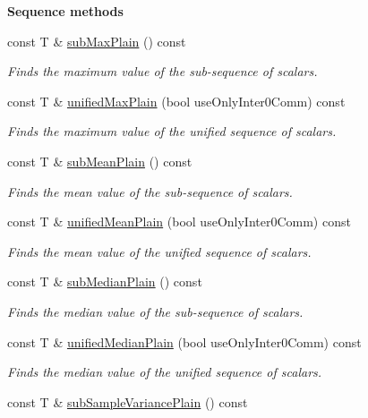 \begin{Indent}{\bf Sequence methods}
\begin{DoxyCompactItemize}
const T \& \hyperlink{class_q_u_e_s_o_1_1_scalar_sequence_ae4689059a4d99dffd386422f1c1aa4b9}{sub\-Max\-Plain} () const 
\begin{DoxyCompactList}\small\item\em Finds the maximum value of the sub-\/sequence of scalars. \end{DoxyCompactList}\item 
const T \& \hyperlink{class_q_u_e_s_o_1_1_scalar_sequence_a70dd5db8c036d364ac56e3cb9c2c7d04}{unified\-Max\-Plain} (bool use\-Only\-Inter0\-Comm) const 
\begin{DoxyCompactList}\small\item\em Finds the maximum value of the unified sequence of scalars. \end{DoxyCompactList}\item 
const T \& \hyperlink{class_q_u_e_s_o_1_1_scalar_sequence_ac900d747f3a7ccbb9f033ae361606ade}{sub\-Mean\-Plain} () const 
\begin{DoxyCompactList}\small\item\em Finds the mean value of the sub-\/sequence of scalars. \end{DoxyCompactList}\item 
const T \& \hyperlink{class_q_u_e_s_o_1_1_scalar_sequence_a6edde80a7c76afe6b67cd0a55434da1b}{unified\-Mean\-Plain} (bool use\-Only\-Inter0\-Comm) const 
\begin{DoxyCompactList}\small\item\em Finds the mean value of the unified sequence of scalars. \end{DoxyCompactList}\item 
const T \& \hyperlink{class_q_u_e_s_o_1_1_scalar_sequence_a5713136cc3128cb51b16b2111cbb1226}{sub\-Median\-Plain} () const 
\begin{DoxyCompactList}\small\item\em Finds the median value of the sub-\/sequence of scalars. \end{DoxyCompactList}\item 
const T \& \hyperlink{class_q_u_e_s_o_1_1_scalar_sequence_a9cc312cf7071927bac5d16b2f948d13f}{unified\-Median\-Plain} (bool use\-Only\-Inter0\-Comm) const 
\begin{DoxyCompactList}\small\item\em Finds the median value of the unified sequence of scalars. \end{DoxyCompactList}\item 
const T \& \hyperlink{class_q_u_e_s_o_1_1_scalar_sequence_a328cd162a455a7c3f6836c5f50502a08}{sub\-Sample\-Variance\-Plain} () const 

\end{DoxyCompactItemize}
\end{Indent}
